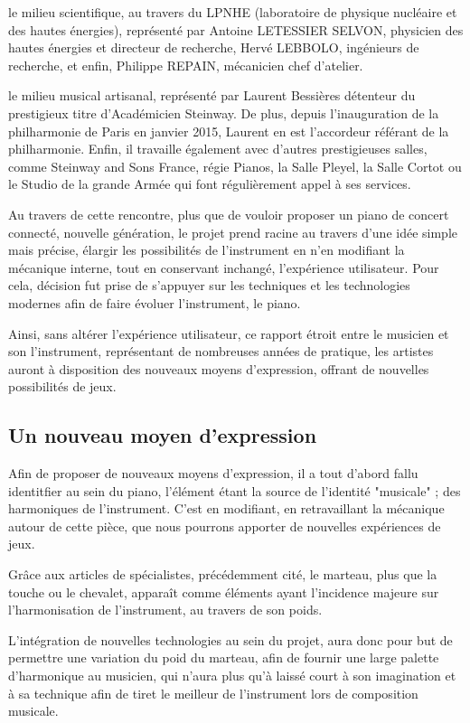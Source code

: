 \documentclass[french,a4paper,12pt]{report}
\begin{document}
	le milieu scientifique, au travers du LPNHE (laboratoire de physique nucléaire et des hautes énergies), représenté par Antoine LETESSIER SELVON, physicien des hautes énergies et directeur de recherche, Hervé LEBBOLO, ingénieurs de recherche, et enfin,  Philippe REPAIN, mécanicien chef d'atelier.
	
	le milieu musical artisanal, représenté par Laurent Bessières détenteur du prestigieux titre d'Académicien Steinway.
	De plus, depuis l'inauguration de la philharmonie de Paris en janvier 2015, Laurent en est l'accordeur référant de la philharmonie. Enfin, il travaille également avec d'autres prestigieuses salles, comme Steinway and Sons France, régie Pianos, la Salle Pleyel, la Salle Cortot ou le Studio de la grande Armée qui font régulièrement appel à ses services.	
	
	Au travers de cette rencontre, plus que de vouloir proposer un piano de concert connecté, nouvelle génération, le projet prend racine au travers d'une idée simple mais précise, élargir les possibilités de l'instrument en n'en modifiant la mécanique interne, tout en conservant inchangé, l'expérience utilisateur.
	Pour cela, décision fut prise de s'appuyer sur les techniques et les technologies modernes afin de faire évoluer l'instrument, le piano.
	
	Ainsi, sans altérer l'expérience utilisateur, ce rapport étroit entre le musicien et son l'instrument, représentant de nombreuses années de pratique, les artistes auront à disposition des nouveaux moyens d'expression, offrant de nouvelles possibilités de jeux.
	
	\newpage
	
		\subsection{Un nouveau moyen d'expression}
		
		Afin de proposer de nouveaux moyens d'expression, il a tout d'abord fallu identitfier au sein du piano, l'élément étant la source de l'identité "musicale" ; des harmoniques de l'instrument. C'est en modifiant, en retravaillant la mécanique autour de cette pièce, que nous pourrons apporter de nouvelles expériences de jeux.
		
		Grâce aux articles de spécialistes, précédemment cité, le marteau, plus que la touche ou le chevalet, apparaît comme éléments ayant l'incidence majeure sur l'harmonisation de l'instrument, au travers de son poids.
		
		L'intégration de nouvelles technologies au sein du projet, aura donc pour but de permettre une variation du poid du marteau, afin de fournir une large palette d'harmonique au musicien, qui n'aura plus qu'à laissé court à son imagination et à sa technique afin de tiret le meilleur de l'instrument lors de composition musicale.
	
\end{document}
